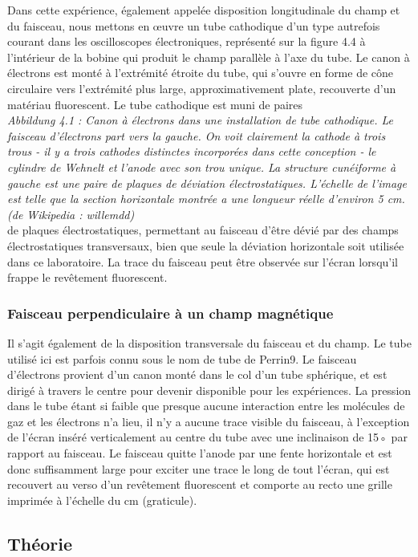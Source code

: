 \documentclass[../main.tex]{subfiles}
\begin{document}
Dans cette expérience, également appelée disposition longitudinale du champ et du faisceau, nous mettons en œuvre un tube cathodique d'un type autrefois courant dans les oscilloscopes électroniques, représenté sur la figure 4.4 à l'intérieur de la bobine qui produit le champ parallèle à l'axe du tube. Le canon à électrons est monté à l'extrémité étroite du tube, qui s'ouvre en forme de cône circulaire vers l'extrémité plus large, approximativement plate, recouverte d'un matériau fluorescent. Le tube cathodique est muni de paires 
\\\textit{Abbildung 4.1 : Canon à électrons dans une installation de tube cathodique. Le faisceau d'électrons part vers la gauche. On voit clairement la cathode à trois trous - il y a trois cathodes distinctes incorporées dans cette conception - le cylindre de Wehnelt et l'anode avec son trou unique. La structure cunéiforme à gauche est une paire de plaques de déviation électrostatiques. L'échelle de l'image est telle que la section horizontale montrée a une longueur réelle d'environ 5 cm. (de Wikipedia : willemdd)} \\
de plaques électrostatiques, permettant au faisceau d'être dévié par des champs électrostatiques transversaux, bien que seule la déviation horizontale soit utilisée dans ce laboratoire. La trace du faisceau peut être observée sur l'écran lorsqu'il frappe le revêtement fluorescent. 
\subsubsection{Faisceau perpendiculaire à un champ magnétique}
Il s'agit également de la disposition transversale du faisceau et du champ. Le tube utilisé ici est parfois connu sous le nom de tube de Perrin9. Le faisceau d'électrons provient d'un canon monté dans le col d'un tube sphérique, et est dirigé à travers le centre pour devenir disponible pour les expériences. La pression dans le tube étant si faible que presque aucune interaction entre les molécules de gaz et les électrons n'a lieu, il n'y a aucune trace visible du faisceau, à l'exception de l'écran inséré verticalement au centre du tube avec une inclinaison de 15◦ par rapport au faisceau. Le faisceau quitte l'anode par une fente horizontale et est donc suffisamment large pour exciter une trace le long de tout l'écran, qui est recouvert au verso d'un revêtement fluorescent et comporte au recto une grille imprimée à l'échelle du cm (graticule).
\subsection{Théorie}
\end{document}
